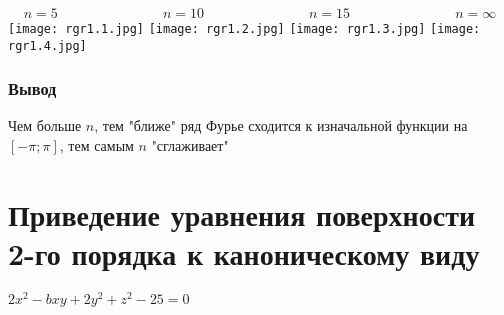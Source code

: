 \documentclass{article}
\begin{document}
    \subsubsection{}
    \begin{equation*}
        n = 5 \; \; \; \; \; \; \; \; \; \; \; \; \; \; \; \; \; \;
        \; \; \; \; \; \; \; \; \;
        n = 10 \; \; \; \; \; \; \; \; \; \; \; \; \; \; \; \; \; \;
        \; \; \; \; \; \; \; \; \;
        n = 15 \; \; \; \; \; \; \; \; \; \; \; \; \; \; \; \; \; \;
        \; \; \; \; \; \; \; \; \;
        n = \infty
    \end{equation*}
    \texttt{[image: rgr1.1.jpg]}
    \texttt{[image: rgr1.2.jpg]}
    \texttt{[image: rgr1.3.jpg]}
    \texttt{[image: rgr1.4.jpg]}
    \subsubsection{Вывод}
    Чем больше $n$, тем "ближе" \; ряд Фурье сходится к изначальной функции на $[-\pi;\pi]$, тем самым $n$ "сглаживает"
    
    
    
    

    
\newpage
    \section{Приведение уравнения поверхности 2-го порядка к каноническому виду}
    $2x^2 - bxy + 2y^2 + z^2 - 25 = 0$
\end{document}
